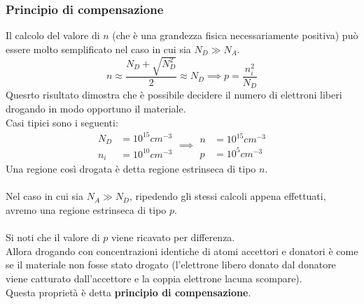 \documentclass{article}
\numberwithin{equation}{subsection}
\begin{document}
	\subsubsection{Principio di compensazione}
	Il calcolo del valore di $n$ (che è una grandezza fisica necessariamente positiva) può essere molto semplificato nel caso in cui sia $N_D \gg N_A$.
	$$n \approx \frac{N_D + \sqrt{N_D^2}}{2} \approx N_D \implies p = \frac{n_i^2}{N_D}$$
	Quesrto risultato dimostra che è possibile decidere il numero di elettroni liberi drogando in modo opportuno il materiale. \\
	Casi tipici sono i seguenti:
	$$\begin{aligned} N_D &= 10^{15} cm^{-3} \\ n_i &= 10^{10} cm^{-3} \end{aligned} \implies \begin{aligned} n &= 10^{15} cm^{-3} \\ p &= 10^5 cm^{-3} \end{aligned}$$
	Una regione così drogata è detta regione estrinseca di tipo $n$.\\\\
	Nel caso in cui sia $N_A \gg N_D$, ripedendo gli stessi calcoli appena effettuati, avremo una regione estrinseca di tipo $p$.\\\\
	Si noti che il valore di $p$ viene ricavato per differenza. \\
	Allora drogando con concentrazioni identiche di atomi accettori e donatori è come se il materiale non fosse stato drogato (l’elettrone libero donato dal donatore viene catturato dall’accettore e la coppia elettrone lacuna scompare). \\
	Questa proprietà è detta \textbf{principio di compensazione}.
\end{document}
